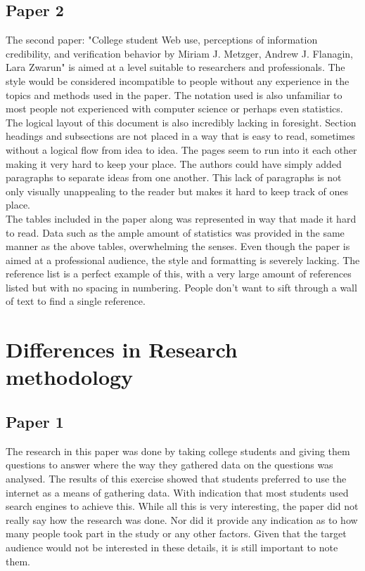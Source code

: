 \documentclass[11pt]{article}
\begin{document}
\subsection{Paper 2}

The second paper: "College student Web use, perceptions of information credibility, and verification behavior by Miriam J. Metzger, Andrew J. Flanagin, Lara Zwarun" \citep{metzger2003college} is aimed at a level suitable to researchers and professionals. The style would be considered incompatible to people without any experience in the topics and methods used in the paper. The notation used is also unfamiliar to most people not experienced with computer science or perhaps even statistics. 
\\

The logical layout of this document is also incredibly lacking in foresight. Section headings and subsections are not placed in a way that is easy to read, sometimes without a logical flow from idea to idea. The pages seem to run into it each other making it very hard to keep your place. The authors could have simply added paragraphs to separate ideas from one another. This lack of paragraphs is not only visually unappealing to the reader but makes it hard to keep track of ones place.
\\

The tables included in the paper along was represented in way that made it hard to read. Data such as the ample amount of statistics was provided in the same manner as the above tables, overwhelming the senses.
Even though the paper is aimed at a professional audience, the style and formatting is severely lacking. The reference list is a perfect example of this, with a very large amount of references listed but with no spacing in numbering. People don't want to sift through a wall of text to find a single reference.

\clearpage
\section{Differences in Research methodology}

\subsection{Paper 1}

The research in this paper was done by taking college students and giving them questions to answer where the way they gathered data on the questions was analysed. The results of this exercise showed that students preferred to use the internet as a means of gathering data. With indication that most students used search engines to achieve this. While all this is very interesting, the paper did not really say how the research was done. Nor did it provide any indication as to how many people took part in the study or any other factors. Given that the target audience would not be interested in these details, it is still important to note them. 
\\
\end{document}
